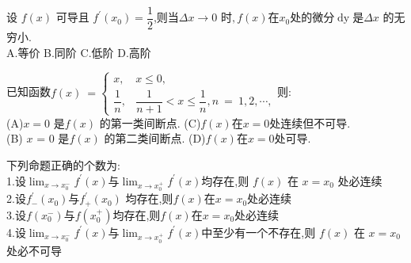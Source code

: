 \documentclass[8pt a4paper, oneside, UTF8]{ctexbook}  %
\begin{document}
\begin{sloppypar}
\begin{note}
    \end{note}
    \begin{problem}
        设 $f(x)$ 可导且 $f^\prime(x_0)=\dfrac12$,则当$\Delta x\to0$ 时$,f(x)$在$x_0$处的微分$\operatorname{dy}$是$\Delta x$ 的无穷小.\\
        A.等价 \quad B.同阶 \quad C.低阶 \quad D.高阶
    \end{problem}
    \begin{solution}
            
    \end{solution}
    \begin{note}
            
    \end{note}
    \begin{problem}
        已知函数$f(x)\:=\begin{cases}x,&x\leqslant0,\\\dfrac{1}{n},&\dfrac{1}{n+1}<x\leq\dfrac{1}{n},n\:=\:1,2,\cdots,\end{cases}$则:\\
        (A)$x=0$ 是$f(x)$ 的第一类间断点. \quad
        (C)$f(x)$在$x=0$处连续但不可导.\\
        (B) $x$ = 0 是$f(x)$ 的第二类间断点.\quad
        (D)$f(x)$在$x=0$处可导.
    \end{problem}
    \begin{solution}
            
    \end{solution}
    \begin{note}
            
    \end{note}
    \begin{problem}
        下列命题正确的个数为:\\
        1.设$\lim_{x\to x_0^-}f^{\prime}(x)$与$\lim_{x\to x_0^+}f^{\prime}(x)$均存在,则 $f(x)$ 在 $x=x_0$ 处必连续\\
        2.设$f^{\prime}_-(x_{0})$与$f^{\prime}_{+}(x_{0})$ 均存在,则$f(x)$在$x=x_{0}$处必连续\\
        3.设$f(x_{0}^{-})$与$f(x_{0}^{+})$均存在,则$f(x)$在$x=x_{0}$处必连续\\
        4.设$\lim_{x\to x_{0}^{-}}f^{\prime}(x)$与$\lim_{x\to x_{0}^{+}}f^{\prime}(x)$中至少有一个不存在,则 $f(x)$ 在 $x=x_0$ 处必不可导
    \end{problem}
    \begin{solution}
            
    \end{solution}
    \begin{note}
            

\end{note}
\end{sloppypar}
\end{document}
